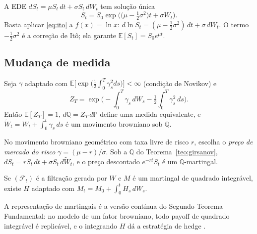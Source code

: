 \begin{exemplo}
A EDE $dS_t=\mu S_t\,dt+\sigma S_t\,dW_t$ tem solução única
\begin{equation}
S_t=S_0\exp\Big(\big(\mu-\tfrac12\sigma^2\big)t+\sigma W_t\Big).
\end{equation}
Basta aplicar \eqref{eq:ito} a $f(x)=\ln x$: $d\ln S_t=(\mu-\tfrac12\sigma^2)\,dt+\sigma\,dW_t$. O termo $-\tfrac12\sigma^2$ é a correção de Itô; ela garante $\mathbb E[S_t]=S_0e^{\mu t}$.
\end{exemplo}

\subsection{Mudança de medida}

\begin{teorema}[Girsanov]\label{teo:girsanov}
Seja $\gamma$ adaptado com $\mathbb E\big[\exp\big(\tfrac12\int_0^T\gamma_s^2ds\big)\big]<\infty$ (condição de Novikov) e
\begin{equation}
Z_T=\exp\Big(-\int_0^T\gamma_s\,dW_s-\tfrac12\int_0^T\gamma_s^2\,ds\Big).
\end{equation}
Então $\mathbb E[Z_T]=1$, $d\mathbb Q=Z_T\,d\mathbb P$ define uma medida equivalente, e $\widetilde W_t=W_t+\int_0^t\gamma_s\,ds$ é um movimento browniano sob $\mathbb Q$.
\end{teorema}

\begin{corolario}
No movimento browniano geométrico com taxa livre de risco $r$, escolha o \emph{preço de mercado do risco} $\gamma=(\mu-r)/\sigma$. Sob a $\mathbb Q$ do Teorema~\ref{teo:girsanov}, $dS_t=rS_t\,dt+\sigma S_t\,d\widetilde W_t$, e o preço descontado $e^{-rt}S_t$ é um $\mathbb Q$-martingal.
\end{corolario}

\begin{teorema}
Se $(\mathcal F_t)$ é a filtração gerada por $W$ e $M$ é um martingal de quadrado integrável, existe $H$ adaptado com $M_t=M_0+\int_0^tH_s\,dW_s$.
\end{teorema}

A representação de martingais é a versão contínua do Segundo Teorema Fundamental: no modelo de um fator browniano, todo payoff de quadrado integrável é replicável, e o integrando $H$ dá a estratégia de hedge \citep{harrisonpliska1981}.
